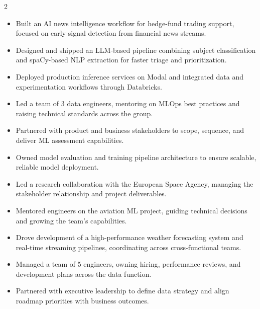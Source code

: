 \documentclass[10pt,a4paper,ragged2e,withhyper]{altacv}
\begin{document}
\begin{paracol}{2}
\begin{itemize}
\end{itemize}
\divider
{}
\begin{itemize}
    \item Built an AI news intelligence workflow for hedge-fund trading support, focused on early signal detection from financial news streams.
    \item Designed and shipped an LLM-based pipeline combining subject classification and spaCy-based NLP extraction for faster triage and prioritization.
    \item Deployed production inference services on Modal and integrated data and experimentation workflows through Databricks.
\end{itemize}
\divider
{}
\begin{itemize}
    \item Led a team of 3 data engineers, mentoring on MLOps best practices and raising technical standards across the group.
    \item Partnered with product and business stakeholders to scope, sequence, and deliver ML assessment capabilities.
    \item Owned model evaluation and training pipeline architecture to ensure scalable, reliable model deployment.
\end{itemize}
\divider
{}
\begin{itemize}
    \item Led a research collaboration with the European Space Agency, managing the stakeholder relationship and project deliverables.
    \item Mentored engineers on the aviation ML project, guiding technical decisions and growing the team's capabilities.
    \item Drove development of a high-performance weather forecasting system and real-time streaming pipelines, coordinating across cross-functional teams.
\end{itemize}
\divider
{}
\begin{itemize}
    \item Managed a team of 5 engineers, owning hiring, performance reviews, and development plans across the data function.
    \item Partnered with executive leadership to define data strategy and align roadmap priorities with business outcomes.

\end{itemize}
\end{paracol}
\end{document}
